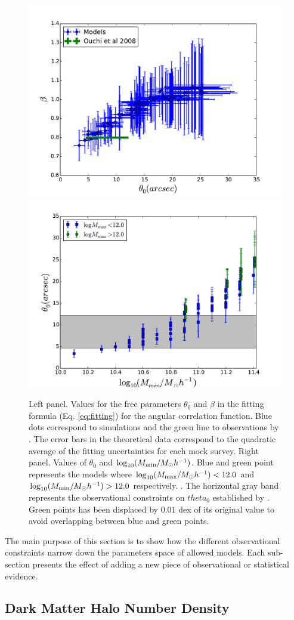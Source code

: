\documentclass{emulateapj}
\begin{document}
\begin{figure}
\begin{center}
\includegraphics[width=0.46\linewidth,angle=0]{Fig7_corr_params.pdf}  
\includegraphics[width=0.46\linewidth,angle=0]{Fig7_mmin_vs_theta.pdf} 
\end{center}
\caption{Left panel. Values for the free parameters $\theta_{0}$ and $\beta$
in the fitting formula (Eq. \ref{eq:fitting}) for the angular
correlation function. Blue dots correspond to simulations and the
green line to observations by \citet{Ouchi2008,Ouchi2010}. The error
bars in the theoretical data correspond to the quadratic average of
the fitting uncertainties for each mock survey. Right panel. Values of
$\theta_{0}$  and $\log_{10}(M_{\rm min}/M_{\odot} h^{-1})$. Blue and
green point represents the models where  $\log_{10}(M_{\rm max}/M_{\odot}
h^{-1})<12.0$ and  $\log_{10}(M_{\rm min}/M_{\odot} h^{-1})>12.0$
respectively. .  The horizontal gray band represents the observational
constraints on $theta_{0}$ established by
\citet{Ouchi2008,Ouchi2010}. Green points has been displaced by
$0.01$ dex of its original value to avoid overlapping between blue and
green points.} \label{fig:correlation_parameters}   
\end{figure}


The main purpose of this section is to show how the different
observational constraints narrow down the parameters space of allowed
models. Each sub-section presents the effect of adding a new piece of 
observational or statistical evidence. 


\subsection{Dark Matter Halo Number Density}
\end{document}
